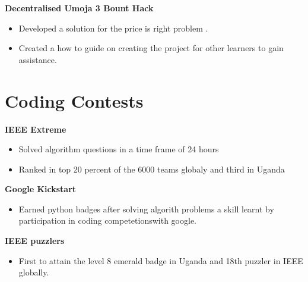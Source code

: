 \documentclass[a4paper]{article}
\begin{document}
\begin{minipage}[t]{0.5\textwidth}
        {\bf Decentralised Umoja 3 Bount Hack}
        \begin{itemize}
            \itemsep0em
            \item Developed a solution for the price is right problem .
            \item Created a how to guide on creating the project for other learners to gain assistance.
        \end{itemize}
        \section*{\bf Coding Contests}
        {\bf IEEE Extreme}
        \begin{itemize}
            \itemsep0em
            \item  Solved algorithm questions in a time frame of 24 hours
            \item Ranked in top 20 percent of the 6000 teams globaly and third in Uganda
        \end{itemize}

        {\bf Google Kickstart}
        \begin{itemize}
            \item Earned python badges after solving algorith problems a skill learnt by participation in coding competetionswith google.
        \end{itemize}

        {\bf IEEE puzzlers}
        \begin{itemize}
            \item First to attain the level 8 emerald badge in Uganda and 18th puzzler in IEEE globally.
        \end{itemize}

    \end{minipage}
    \hfil
\end{document}
